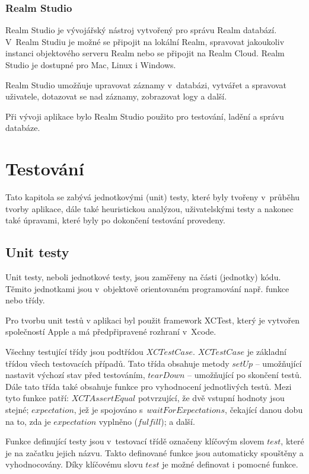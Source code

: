 \documentclass[thesis=M,czech]{FITthesis}[2012/06/26]
\begin{document}
\subsection{Realm Studio}
Realm Studio je vývojářský nástroj vytvořený pro správu Realm databází. V~Realm Studiu je možné se připojit na lokální Realm, spravovat jakoukoliv instanci objektového serveru Realm nebo se připojit na Realm Cloud. Realm Studio je dostupné pro Mac, Linux i Windows. \cite{realmStudio}

Realm Studio umožňuje upravovat záznamy v~databázi, vytvářet a spravovat uživatele, dotazovat se nad záznamy, zobrazovat logy a další. \cite{realmStudio}

Při vývoji aplikace bylo Realm Studio použito pro testování, ladění a správu databáze.

\chapter{Testování}
Tato kapitola se zabývá jednotkovými (unit) testy, které byly tvořeny v~průběhu tvorby aplikace, dále také heuristickou analýzou, uživatelskými testy a nakonec také úpravami, které byly po dokončení testování provedeny.

\section{Unit testy}
Unit testy, neboli jednotkové testy, jsou zaměřeny na části (jednotky) kódu. Těmito jednotkami jsou v~objektově orientovaném programování např. funkce nebo třídy. \cite{unitTesting}

Pro tvorbu unit testů v aplikaci byl použit framework XCTest, který je vytvořen společností Apple a má předpřipravené rozhraní v~Xcode. \cite{appleTesting}

Všechny testující třídy jsou podtřídou $XCTestCase$. $XCTestCase$ je základní třídou všech testovacích případů. Tato třída obsahuje metody $setUp$ -- umožňující nastavit výchozí stav před testováním, $tearDown$ -- umožňující  po skončení testů. Dále tato třída také obsahuje funkce pro vyhodnocení jednotlivých testů. Mezi tyto funkce patří: $XCTAssertEqual$ potvrzující, že dvě vstupní hodnoty jsou stejné; $expectation$, jež je spojováno s~$waitForExpectations$, čekající danou dobu na to, zda je $expectation$ vyplněno ($fulfill$); a další. \cite{XCTestCase}

Funkce definující testy jsou v~testovací třídě označeny klíčovým slovem $test$, které je na začatku jejich názvu. Takto definované funkce jsou automaticky spouštěny a vyhodnocovány. Díky klíčovému slovu $test$ je možné definovat i pomocné funkce. \cite{XCTestCase}
\end{document}
